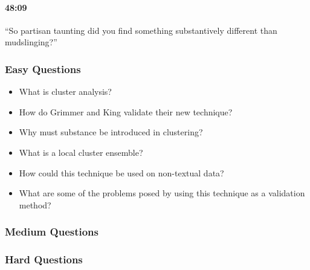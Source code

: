 \documentclass[11pt]{article}
\begin{document}
\paragraph{48:09} ``So partisan taunting did you find something substantively different than mudslinging?''

\subsubsection{Easy Questions}
\begin{itemize}
\item What is cluster analysis?
\item How do Grimmer and King validate their new technique?
\item Why must substance be introduced in clustering?
\item What is a local cluster ensemble?
\item How could this technique be used on non-textual data?
\item What are some of the problems posed by using this technique as a validation method?
\end{itemize}

\subsubsection{Medium Questions}


\subsubsection{Hard Questions}



\printindex
\end{document}

